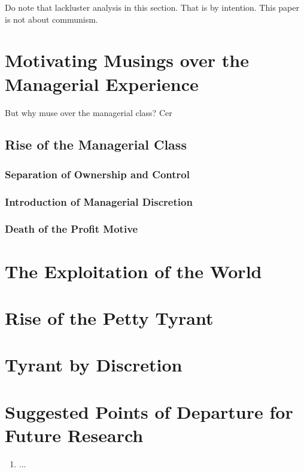 \documentclass[12pt]{article}
\begin{document}
Do note that lackluster analysis in this section.
That is by intention.
This paper is not about communism.




\section{Motivating Musings over the Managerial Experience}
But why muse over the managerial class?
Cer

\subsection{Rise of the Managerial Class}
\subsubsection{Separation of Ownership and Control}
\subsubsection{Introduction of Managerial Discretion}
\subsubsection{Death of the Profit Motive}

\section{The Exploitation of the World}
\section{Rise of the Petty Tyrant}
\section{Tyrant by Discretion}

\section{Suggested Points of Departure for Future Research}


\begin{enumerate}
    \item ...
\end{enumerate}
\end{document}
